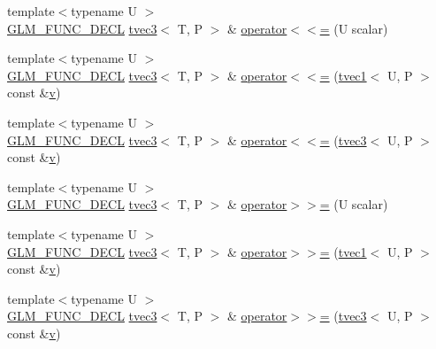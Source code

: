 \begin{DoxyCompactItemize}
\item 
{\footnotesize template$<$typename U $>$ }\\\mbox{\hyperlink{setup_8hpp_ab2d052de21a70539923e9bcbf6e83a51}{G\+L\+M\+\_\+\+F\+U\+N\+C\+\_\+\+D\+E\+CL}} \mbox{\hyperlink{structglm_1_1tvec3}{tvec3}}$<$ T, P $>$ \& \mbox{\hyperlink{structglm_1_1tvec3_abadcfbf4495179ac2e32d2f986d7bbb6}{operator$<$$<$=}} (U scalar)
\item 
{\footnotesize template$<$typename U $>$ }\\\mbox{\hyperlink{setup_8hpp_ab2d052de21a70539923e9bcbf6e83a51}{G\+L\+M\+\_\+\+F\+U\+N\+C\+\_\+\+D\+E\+CL}} \mbox{\hyperlink{structglm_1_1tvec3}{tvec3}}$<$ T, P $>$ \& \mbox{\hyperlink{structglm_1_1tvec3_af0d715a07138f9619ac7ee1924fa8940}{operator$<$$<$=}} (\mbox{\hyperlink{structglm_1_1tvec1}{tvec1}}$<$ U, P $>$ const \&\mbox{\hyperlink{glad_8h_a14cfbe2fc2234f5504618905b69d1e06}{v}})
\item 
{\footnotesize template$<$typename U $>$ }\\\mbox{\hyperlink{setup_8hpp_ab2d052de21a70539923e9bcbf6e83a51}{G\+L\+M\+\_\+\+F\+U\+N\+C\+\_\+\+D\+E\+CL}} \mbox{\hyperlink{structglm_1_1tvec3}{tvec3}}$<$ T, P $>$ \& \mbox{\hyperlink{structglm_1_1tvec3_af05b4498d260dd9d784292b6a7873a80}{operator$<$$<$=}} (\mbox{\hyperlink{structglm_1_1tvec3}{tvec3}}$<$ U, P $>$ const \&\mbox{\hyperlink{glad_8h_a14cfbe2fc2234f5504618905b69d1e06}{v}})
\item 
{\footnotesize template$<$typename U $>$ }\\\mbox{\hyperlink{setup_8hpp_ab2d052de21a70539923e9bcbf6e83a51}{G\+L\+M\+\_\+\+F\+U\+N\+C\+\_\+\+D\+E\+CL}} \mbox{\hyperlink{structglm_1_1tvec3}{tvec3}}$<$ T, P $>$ \& \mbox{\hyperlink{structglm_1_1tvec3_aa4fd6ddbdc563f18f8f172c27ee83e11}{operator$>$$>$=}} (U scalar)
\item 
{\footnotesize template$<$typename U $>$ }\\\mbox{\hyperlink{setup_8hpp_ab2d052de21a70539923e9bcbf6e83a51}{G\+L\+M\+\_\+\+F\+U\+N\+C\+\_\+\+D\+E\+CL}} \mbox{\hyperlink{structglm_1_1tvec3}{tvec3}}$<$ T, P $>$ \& \mbox{\hyperlink{structglm_1_1tvec3_a7cb73c7e9a6756532e450515bc7f67ec}{operator$>$$>$=}} (\mbox{\hyperlink{structglm_1_1tvec1}{tvec1}}$<$ U, P $>$ const \&\mbox{\hyperlink{glad_8h_a14cfbe2fc2234f5504618905b69d1e06}{v}})
\item 
{\footnotesize template$<$typename U $>$ }\\\mbox{\hyperlink{setup_8hpp_ab2d052de21a70539923e9bcbf6e83a51}{G\+L\+M\+\_\+\+F\+U\+N\+C\+\_\+\+D\+E\+CL}} \mbox{\hyperlink{structglm_1_1tvec3}{tvec3}}$<$ T, P $>$ \& \mbox{\hyperlink{structglm_1_1tvec3_a42bc834efe85364cd4ec1f3398c433be}{operator$>$$>$=}} (\mbox{\hyperlink{structglm_1_1tvec3}{tvec3}}$<$ U, P $>$ const \&\mbox{\hyperlink{glad_8h_a14cfbe2fc2234f5504618905b69d1e06}{v}})

\end{DoxyCompactItemize}
